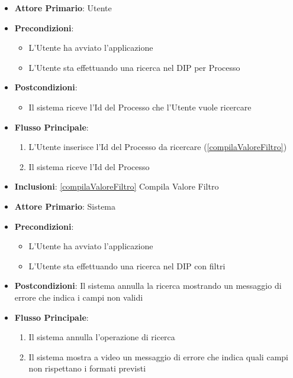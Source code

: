 \begin{itemize}
      \item \textbf{Attore Primario}: Utente
      \item \textbf{Precondizioni}:
      \begin{itemize}
            \item L'Utente ha avviato l'applicazione
            \item L'Utente sta effettuando una ricerca nel DIP per Processo
      \end{itemize}
      \item \textbf{Postcondizioni}:
      \begin{itemize}
            \item Il sistema riceve l'Id del Processo che l'Utente vuole ricercare
      \end{itemize}
      \item \textbf{Flusso Principale}:
      \begin{enumerate}
            \item L'Utente inserisce l'Id del Processo da ricercare (\ref{compilaValoreFiltro})
            \item Il sistema riceve l'Id del Processo
      \end{enumerate}
      \item \textbf{Inclusioni}: \ref{compilaValoreFiltro} Compila Valore Filtro
\end{itemize}

\begin{itemize}
      \item \textbf{Attore Primario}: Sistema
      \item \textbf{Precondizioni}: 
      \begin{itemize}
            \item L'Utente ha avviato l'applicazione
            \item L'Utente sta effettuando una ricerca nel DIP con filtri
      \end{itemize}
      \item \textbf{Postcondizioni}: Il sistema annulla la ricerca mostrando un messaggio di errore che indica i campi non validi
      \item \textbf{Flusso Principale}:
      \begin{enumerate}
            \item Il sistema annulla l'operazione di ricerca
            \item Il sistema mostra a video un messaggio di errore che indica quali campi non rispettano i formati previsti
      \end{enumerate}
\end{itemize}





